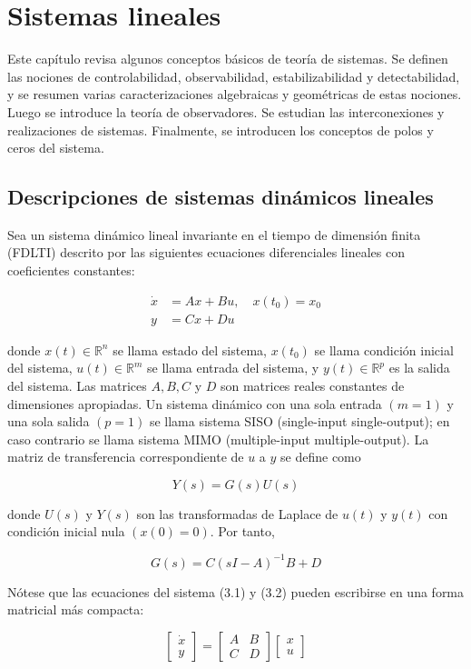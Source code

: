 \chapter{Sistemas lineales}

Este capítulo revisa algunos conceptos básicos de teoría de sistemas. Se definen las nociones de controlabilidad, observabilidad, estabilizabilidad y detectabilidad, y se resumen varias caracterizaciones algebraicas y geométricas de estas nociones. Luego se introduce la teoría de observadores. Se estudian las interconexiones y realizaciones de sistemas. Finalmente, se introducen los conceptos de polos y ceros del sistema.

\section{Descripciones de sistemas dinámicos lineales}
Sea un sistema dinámico lineal invariante en el tiempo de dimensión finita (FDLTI) descrito por las siguientes ecuaciones diferenciales lineales con coeficientes constantes:


\begin{align*}
\dot{x} & =A x+B u, \quad x\left(t_{0}\right)=x_{0}  \tag{3.1}\\
y & =C x+D u \tag{3.2}
\end{align*}


donde $x(t) \in \mathbb{R}^{n}$ se llama estado del sistema, $x\left(t_{0}\right)$ se llama condición inicial del sistema, $u(t) \in \mathbb{R}^{m}$ se llama entrada del sistema, y $y(t) \in \mathbb{R}^{p}$ es la salida del sistema. Las matrices $A, B, C$ y $D$ son matrices reales constantes de dimensiones apropiadas. Un sistema dinámico con una sola entrada $(m=1)$ y una sola salida $(p=1)$ se llama sistema SISO (single-input single-output); en caso contrario se llama sistema MIMO (multiple-input multiple-output). La matriz de transferencia correspondiente de $u$ a $y$ se define como

$$
Y(s)=G(s) U(s)
$$

donde $U(s)$ y $Y(s)$ son las transformadas de Laplace de $u(t)$ y $y(t)$ con condición inicial nula $(x(0)=0)$. Por tanto,

$$
G(s)=C(s I-A)^{-1} B+D
$$

Nótese que las ecuaciones del sistema (3.1) y (3.2) pueden escribirse en una forma matricial más compacta:

$$
\left[\begin{array}{l}
\dot{x} \\
y
\end{array}\right]=\left[\begin{array}{cc}
A & B \\
C & D
\end{array}\right]\left[\begin{array}{l}
x \\
u
\end{array}\right]
$$

